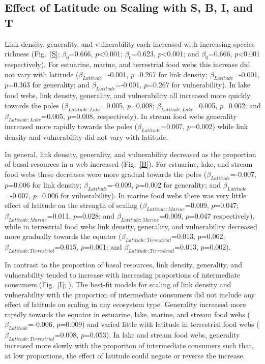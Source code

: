 \documentclass[12pt]{article}
\begin{document}
\subsection*{Effect of Latitude on Scaling with S, B, I, and T}

  Link density, generality, and vulnerability each increased with increasing
  species richness (Fig.~\ref{S}; $\beta_0$=0.666, $p$\textless0.001; $\beta_0$=0.623,
  $p$\textless0.001; and $\beta_0$=0.666, $p$\textless0.001 respectively).  For estuarine,
  marine, and terrestrial food webs this increase did not vary with latitude
  ($\beta_{Latitude}$=-0.001, $p$=0.267 for link density; $\beta_{Latitude}$=-0.001, $p$=0.363 for generality;
  and $\beta_{Latitude}$=-0.001, $p$=0.267 for vulnerability). In lake food webs, link density,
  generality, and vulnerability all increased more quickly towards the poles
  ($\beta_{Latitude:Lake}$=0.005, $p$=0.008; $\beta_{Latitude:Lake}$=0.005,
  $p$=0.002; and $\beta_{Latitude:Lake}$=0.005, $p$=0.008, respectively). In
  stream food webs generality increased more rapidly towards the poles 
  ($\beta_{Latitude}$=0.007, $p$=0.002) while link density and vulnerability did not vary with latitude.


  In general, link density, generality, and vulnerability decreased as the
  proportion of basal resources in a web increased (Fig.~\ref{B}). For
  estuarine, lake, and stream food webs these decreases were more gradual towards the
  poles ($\beta_{Latitude}$=-0.007, $p$=0.006 for link density;
  $\beta_{Latitude}$=-0.009, $p$=0.002 for generality; and
  $\beta_{Latitude}$=-0.007, $p$=0.006 for vulnerability).
  In marine food webs there was very little effect of latitude on
  the strength of scaling ($\beta_{Latitude:Marine}$=0.009, $p$=0.047; 
  $\beta_{Latitude:Marine}$=0.011, $p$=0.028; 
  and $\beta_{Latitude:Marine}$=0.009, $p$=0.047 respectively),
  while in terrestrial food webs link density, generality, and vulnerability
  decreased more gradually towards the 
  equator ($\beta_{Latitude:Terrestrial}$=0.013, $p$=0.002; 
  $\beta_{Latitude:Terrestrial}$=0.015, $p$=0.001; 
  and $\beta_{Latitude:Terrestrial}$=0.013, $p$=0.002).


  In contrast to the proportion of basal resources, link density, generality,
  and vulnerability tended to increase with increasing proportions of
  intermediate consumers (Fig.~\ref{I}; ). The best-fit models for scaling of link
  density and vulnerability with the proportion of intermediate consumers did
  not include any effect of latitude on scaling in any ecosystem type. Generality
  increased more rapidly towards the equator in estuarine, lake, marine, and
  stream food webs ($\beta_{Latitude}$=-0.006, $p$=0.009) and varied little with
  latitude in terrestrial food webs ($\beta_{Latitude:Terrestrial}$=0.008,
  $p$=0.053). In lake and stream food webs, generality increased more slowly
  with the proporiton of intermediate consumers such that, at low proportions,
  the effect of latitude could negate or reverse the increase.
\end{document}
